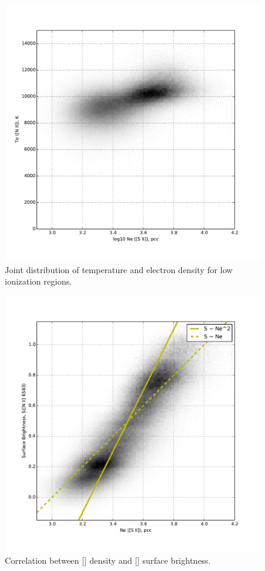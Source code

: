 \documentclass[preprint, 10pt]{aastex}
\newcommand\nii{[\ion{N}{2}]}
\newcommand\sii{[\ion{S}{2}]}
\begin{document}
\begin{figure}
  \centering
  \includegraphics[width=0.8\linewidth]{Te-versus-Ne}
  \caption{Joint distribution of temperature and electron density for
    low ionization regions.}
  \label{fig:Te-Ne}
\end{figure}

\begin{figure}
  \centering
  \includegraphics[width=0.8\linewidth]{snii-versus-ne}
  \caption{Correlation between \sii{} density and \nii{} surface brightness.}
  \label{fig:Snii-ne}
\end{figure}



\end{document}
